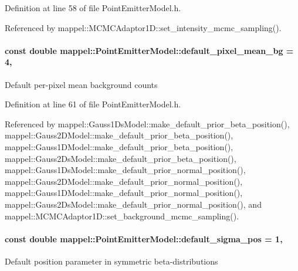 Definition at line 58 of file Point\+Emitter\+Model.\+h.



Referenced by mappel\+::\+M\+C\+M\+C\+Adaptor1\+D\+::set\+\_\+intensity\+\_\+mcmc\+\_\+sampling().

\paragraph[{\texorpdfstring{default\+\_\+pixel\+\_\+mean\+\_\+bg}{default_pixel_mean_bg}}]{\setlength{\rightskip}{0pt plus 5cm}const double mappel\+::\+Point\+Emitter\+Model\+::default\+\_\+pixel\+\_\+mean\+\_\+bg = 4\hspace{0.3cm}{\ttfamily [static]}, {\ttfamily [inherited]}}\hypertarget{classmappel_1_1PointEmitterModel_abe82d75be8586234657a61e2f137a6c8}{}\label{classmappel_1_1PointEmitterModel_abe82d75be8586234657a61e2f137a6c8}
Default per-\/pixel mean background counts 

Definition at line 61 of file Point\+Emitter\+Model.\+h.



Referenced by mappel\+::\+Gauss1\+Ds\+Model\+::make\+\_\+default\+\_\+prior\+\_\+beta\+\_\+position(), mappel\+::\+Gauss2\+D\+Model\+::make\+\_\+default\+\_\+prior\+\_\+beta\+\_\+position(), mappel\+::\+Gauss1\+D\+Model\+::make\+\_\+default\+\_\+prior\+\_\+beta\+\_\+position(), mappel\+::\+Gauss2\+Ds\+Model\+::make\+\_\+default\+\_\+prior\+\_\+beta\+\_\+position(), mappel\+::\+Gauss1\+Ds\+Model\+::make\+\_\+default\+\_\+prior\+\_\+normal\+\_\+position(), mappel\+::\+Gauss2\+D\+Model\+::make\+\_\+default\+\_\+prior\+\_\+normal\+\_\+position(), mappel\+::\+Gauss1\+D\+Model\+::make\+\_\+default\+\_\+prior\+\_\+normal\+\_\+position(), mappel\+::\+Gauss2\+Ds\+Model\+::make\+\_\+default\+\_\+prior\+\_\+normal\+\_\+position(), and mappel\+::\+M\+C\+M\+C\+Adaptor1\+D\+::set\+\_\+background\+\_\+mcmc\+\_\+sampling().

\paragraph[{\texorpdfstring{default\+\_\+sigma\+\_\+pos}{default_sigma_pos}}]{\setlength{\rightskip}{0pt plus 5cm}const double mappel\+::\+Point\+Emitter\+Model\+::default\+\_\+sigma\+\_\+pos = 1\hspace{0.3cm}{\ttfamily [static]}, {\ttfamily [inherited]}}\hypertarget{classmappel_1_1PointEmitterModel_aa98a73b9e3937c00b07596d3928df3ca}{}\label{classmappel_1_1PointEmitterModel_aa98a73b9e3937c00b07596d3928df3ca}
Default position parameter in symmetric beta-\/distributions 

